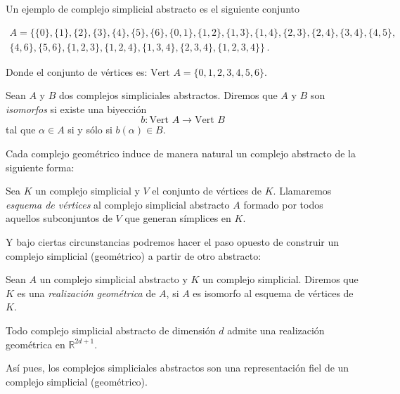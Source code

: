 \begin{exmp}
Un ejemplo de complejo simplicial abstracto es el siguiente conjunto 

\begin{gather*}
A = \{\{0\},\{1\},\{2\},\{3\},\{4\},\{5\},\{6\},\{0,1\},\{1,2\},\{1,3\},\{1,4\},\{2,3\},\{2,4\},\{3,4\},\{4,5\},\\
\{4,6\},\{5,6\},\{1,2,3\},\{1,2,4\},\{1,3,4\},\{2,3,4\},\{1,2,3,4\}\}\,.
\end{gather*}

Donde el conjunto de vértices es: $\text{Vert }A = \{0, 1, 2, 3, 4, 5, 6\}$.
\end{exmp}

\begin{definition}
Sean $A$ y $B$ dos complejos simpliciales abstractos. Diremos que $A$ y $B$ son \emph{isomorfos} si existe una biyección \[b:\text{Vert }A \to \text{Vert }B\] tal que $\alpha \in A$ si y sólo si $b(\alpha) \in B$.
\end{definition}

Cada complejo geométrico induce de manera natural un complejo abstracto de la siguiente forma:
\begin{definition}
Sea $K$ un complejo simplicial y $V$ el conjunto de vértices de $K$. Llamaremos \emph{esquema de vértices} al complejo simplicial abstracto $A$ formado por todos aquellos subconjuntos de $V$ que generan símplices en $K$.
\end{definition}

Y bajo ciertas circunstancias podremos hacer el paso opuesto de construir un complejo simplicial (geométrico) a partir de otro abstracto:
\begin{definition}
Sean $A$ un complejo simplicial abstracto y $K$ un complejo simplicial. Diremos que $K$ es una \emph{realización geométrica} de $A$, si $A$ es isomorfo al esquema de vértices de $K$.
\end{definition}

\begin{theorem}
Todo complejo simplicial abstracto de dimensión $d$ admite una realización geométrica en $\mathbb{R}^{2d + 1}$.
\end{theorem}

Así pues, los complejos simpliciales abstractos son una representación fiel de un complejo simplicial (geométrico).

